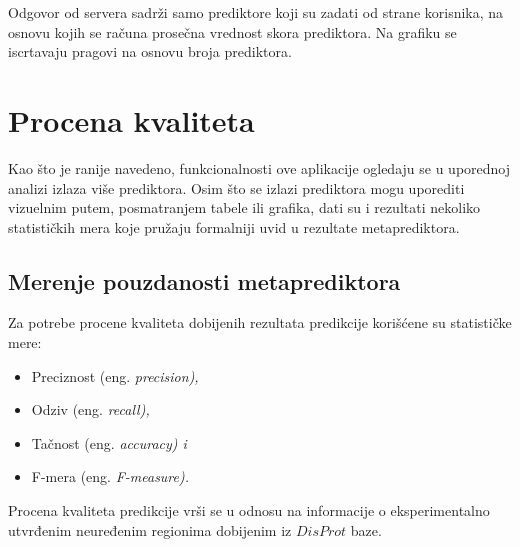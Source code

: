 Odgovor od servera sadrži samo prediktore koji su zadati od strane korisnika, na osnovu kojih se računa prosečna vrednost skora prediktora. Na grafiku se iscrtavaju pragovi na osnovu broja prediktora. 

\section{Procena kvaliteta}
Kao što je ranije navedeno, funkcionalnosti ove aplikacije ogledaju se u uporednoj analizi izlaza više prediktora. Osim što se izlazi prediktora mogu uporediti vizuelnim putem, posmatranjem tabele ili grafika, dati su i rezultati nekoliko statističkih mera koje pružaju formalniji uvid u rezultate metaprediktora. 

\subsection{Merenje pouzdanosti metaprediktora}
 Za potrebe procene kvaliteta dobijenih rezultata predikcije korišćene su statističke mere:
\begin{itemize}
\item Preciznost (eng. \em{precision}), 
\item Odziv (eng.  \em{recall}), 
\item Tačnost (eng. \em{accuracy}) i 
\item F-mera (eng. \em{F-measure}). 
\end{itemize} 
Procena kvaliteta predikcije vrši se u odnosu na informacije o eksperimentalno utvrđenim neuređenim regionima dobijenim iz $DisProt$ baze.\\


